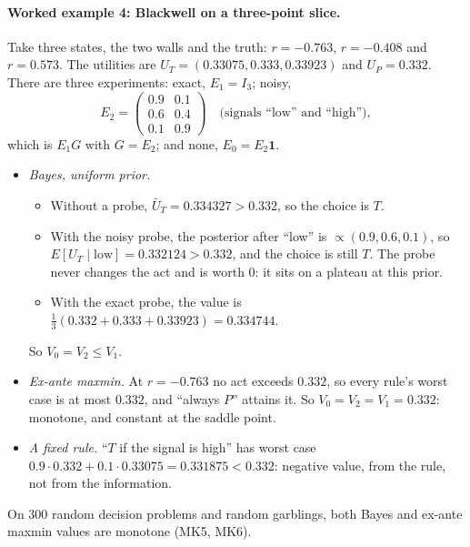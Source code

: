 \documentclass[11pt]{article}
\theoremstyle{definition}\newtheorem{definition}{Definition}\newtheorem{remark}{Remark}
\begin{document}
\paragraph{Worked example 4: Blackwell on a three-point slice.} Take three states, the two walls and the truth: $r=-0.763$,
$r=-0.408$ and $r=0.573$. The utilities are $U_T=(0.33075,0.333,0.33923)$ and $U_P=0.332$. There are three experiments: exact, $E_1=I_3$; noisy,
\[
E_2=\begin{pmatrix}0.9&0.1\\0.6&0.4\\0.1&0.9\end{pmatrix}\quad\text{(signals ``low'' and ``high'')},
\]
which is $E_1G$ with $G=E_2$; and none, $E_0=E_2\mathbf 1$.
\begin{itemize}
\item \emph{Bayes, uniform prior.}
  \begin{itemize}
  \item Without a probe, $\bar U_T=0.334327>0.332$, so the choice is $T$.
  \item With the noisy probe, the posterior after ``low'' is $\propto(0.9,0.6,0.1)$, so $E[U_T\mid\text{low}]=0.332124>0.332$, and the
    choice is still $T$. The probe never changes the act and is worth $0$: it sits on a plateau at this prior.
  \item With the exact probe, the value is $\tfrac13(0.332+0.333+0.33923)=0.334744$.
  \end{itemize}
  So $V_0=V_2\le V_1$.
\item \emph{Ex-ante maxmin.} At $r=-0.763$ no act exceeds $0.332$, so every rule's worst case is at most $0.332$, and ``always $P$''
  attains it. So $V_0=V_2=V_1=0.332$: monotone, and constant at the saddle point.
\item \emph{A fixed rule.} ``$T$ if the signal is high'' has worst case $0.9\cdot0.332+0.1\cdot0.33075=0.331875<0.332$: negative value,
  from the rule, not from the information.
\end{itemize}
On $300$ random decision problems and random garblings, both Bayes and ex-ante maxmin values are monotone (MK5, MK6).
\end{document}
